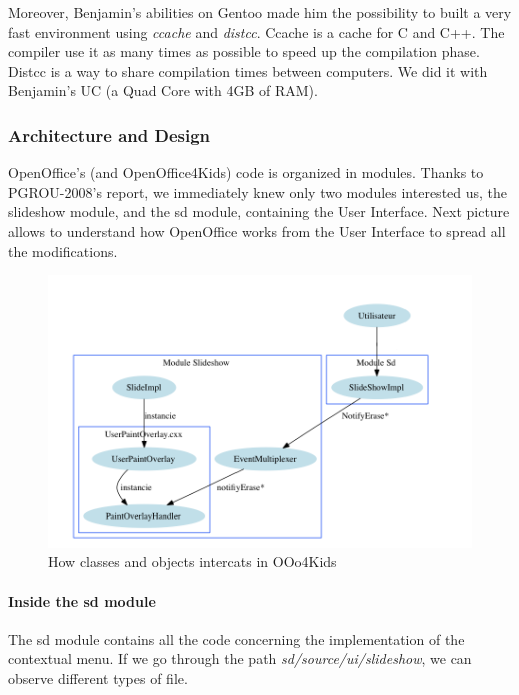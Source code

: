 \documentclass[a4paper,11pt]{article}
\begin{document}
Moreover, Benjamin's abilities on Gentoo made him the possibility to built a very fast environment using \emph{ccache} and \emph{distcc}. Ccache is a cache for C and C++. The compiler use it as many times as possible to speed up the compilation phase. Distcc is a way to share compilation times between computers. We did it with Benjamin's UC (a Quad Core with 4GB of RAM).


\subsubsection*{Architecture and Design}

OpenOffice’s (and OpenOffice4Kids) code is organized in modules. Thanks to PGROU-2008’s report, we immediately knew only two modules interested us, the slideshow module, and the sd module, containing the User Interface. Next picture allows to understand how OpenOffice works from the User
Interface to spread all the modifications.

\begin{figure}[!h]
\centering
\includegraphics[scale=0.5]{images/Slideshow_interaction.png}
\caption{How classes and objects intercats in OOo4Kids}
\end{figure}   

\paragraph*{Inside the sd module}
The sd module contains all the code concerning the implementation of the contextual menu. If we go through the path \emph{sd/source/ui/slideshow}, we can observe different types of file.
\end{document}
